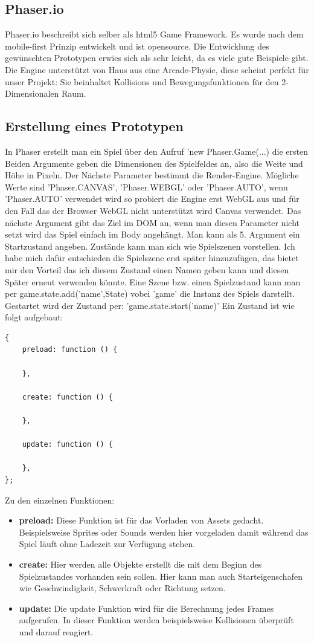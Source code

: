 \subsection{Phaser.io}
Phaser.io beschreibt sich selber als html5 Game Framework. Es wurde nach dem mobile-first Prinzip entwickelt und ist opensource.
Die Entwicklung des gewünschten Prototypen erwies sich als sehr leicht, da es viele gute Beispiele gibt.
Die Engine unterstützt von Haus aus eine Arcade-Physic, diese scheint perfekt für unser Projekt: Sie beinhaltet Kollisions und Bewegungsfunktionen für den 2-Dimensionalen Raum.
\subsection{Erstellung eines Prototypen}
In Phaser erstellt man ein Spiel über den Aufruf 'new Phaser.Game(...) die ersten Beiden Argumente geben die Dimensionen des Spielfeldes an, also die Weite und Höhe in Pixeln. 
\newline
Der Nächste Parameter bestimmt die Render-Engine. 
Mögliche Werte sind 'Phaser.CANVAS', 'Phaser.WEBGL' oder 'Phaser.AUTO', wenn 'Phaser.AUTO' verwendet wird so probiert die Engine erst WebGL aus und für den Fall das der Browser WebGL nicht unterstützt wird Canvas verwendet.
\newline
Das nächste Argument gibt das Ziel im DOM an, wenn man diesen Parameter nicht setzt wird das Spiel einfach im Body angehängt.
\newline
Man kann als 5. Argument ein Startzustand angeben. Zustände kann man sich wie Spielszenen vorstellen. 
Ich habe mich dafür entschieden die Spielszene erst später hinzuzufügen, das bietet mir den Vorteil das ich diesem Zustand einen Namen geben kann und diesen Später erneut verwenden könnte.
\newpage
Eine Szene bzw. einen Spielzustand kann man per game.state.add('name',State) vobei 'game' die Instanz des Spiels darstellt.
Gestartet wird der Zustand per: 'game.state.start('name)'
Ein Zustand ist wie folgt aufgebaut:
\begin{lstlisting}
{
    preload: function () {
 
    },
 
    create: function () {
 
    },
 
    update: function () {
 
    },
};
\end{lstlisting}
Zu den einzelnen Funktionen:
\begin{itemize}
	\item
	      \textbf{preload:} Diese Funktion ist für das Vorladen von Assets gedacht. Beispielsweise Sprites oder Sounds werden hier vorgeladen damit während das Spiel läuft ohne Ladezeit zur Verfügung stehen.
	\item
	      \textbf{create:} Hier werden alle Objekte erstellt die mit dem Beginn des Spielzustandes vorhanden sein sollen. Hier kann man auch Starteigenschafen wie Geschwindigkeit, Schwerkraft oder Richtung setzen.
	\item
	      \textbf{update:} Die update Funktion wird für die Berechnung jedes Frames aufgerufen. In dieser Funktion werden beispielsweise Kollisionen überprüft und darauf reagiert.
\end{itemize}
